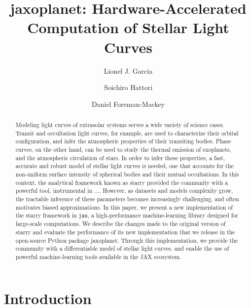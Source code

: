 \documentclass[modern]{aastex631}
\begin{document}
\title{\textsf{jaxoplanet}: Hardware-Accelerated Computation of Stellar Light Curves}

\author{Lionel J. Garcia}
\author{Soichiro Hattori}
\author{Daniel Foreman-Mackey}

\keywords{}

\begin{abstract}
    Modeling light curves of extrasolar systems serves a wide variety of science cases. Transit and occultation light curves, for example, are used to characterize their orbital configuration, and infer the atmospheric properties of their transiting bodies. Phase curves, on the other hand, can be used to study the thermal emission of exoplanets, and the atmospheric circulation of stars. In order to infer these properties, a fast, accurate and robust model of stellar light curves is needed, one that accounts for the non-uniform surface intensity of spherical bodies and their mutual occultations. In this context, the analytical framework known as \textsf{starry} provided the community with a powerful tool, instrumental in .... However, as datasets and models complexity grow, the tractable inference of these parameters becomes increasingly challenging, and often motivates biased approximations. In this paper, we present a new implementation of the \textsf{starry} framework in \texttt{jax}, a high-performance machine-learning library designed for large-scale computations. We describe the changes made to the original version of \textsf{starry} and evaluate the performance of its new implementation that we release in the open-source Python package \textsf{jaxoplanet}. Through this implementation, we provide the community with a differentiable model of stellar light curves, and enable the use of powerful machine-learning tools available in the \textsf{JAX} ecosystem. \gitlink{}

\end{abstract}

\section{Introduction}
\end{document}
